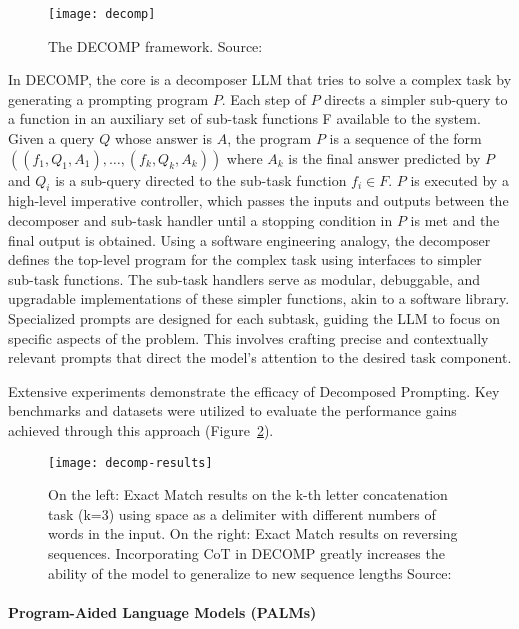 \begin{figure}[h!]
	\centering
	\texttt{[image: decomp]}
	\caption{The DECOMP framework. Source: \textcite{khot2022decomposed}}
	\label{fig:decomp}
\end{figure}

In DECOMP, the core is a decomposer LLM that tries to solve a complex task by generating a prompting program $P$.
Each step of $P$ directs a simpler sub-query to a function in an auxiliary set of sub-task functions F available to the system.
Given a query $Q$ whose answer is $A$, the program $P$ is a sequence of the form $((f_1, Q_1, A_1), \ldots ,(f_k, Q_k, A_k))$
where $A_k$ is the final answer predicted by $P$ and $Q_i$ is a sub-query directed to the sub-task function $f_i \in F$.
$P$ is executed by a high-level imperative controller, which passes the inputs and outputs between the decomposer and sub-task handler until a stopping condition in $P$ is met and the final output is obtained.
Using a software engineering analogy, the decomposer defines the top-level program for the complex task using interfaces to simpler sub-task functions.
The sub-task handlers serve as modular, debuggable, and upgradable implementations of these simpler functions, akin to a software library.
Specialized prompts are designed for each subtask, guiding the LLM to focus on specific aspects of the problem.
This involves crafting precise and contextually relevant prompts that direct the model's attention to the desired task component.

Extensive experiments demonstrate the efficacy of Decomposed Prompting.
Key benchmarks and datasets were utilized to evaluate the performance gains achieved through this approach (Figure~\ref{fig:decomp-results}).

\begin{figure}[h!]
	\centering
	\texttt{[image: decomp-results]}
	\caption{On the left: Exact Match results on the k-th letter concatenation task (k=3) using space as a delimiter with different numbers of words in the input. On the right: Exact Match results on reversing sequences. Incorporating CoT in DECOMP greatly increases the ability of the model to generalize to new sequence lengths Source: \textcite{khot2022decomposed}}
	\label{fig:decomp-results}
\end{figure}

\paragraph{Program-Aided Language Models (PALMs)}
\label{par:program-aided-language-models}

